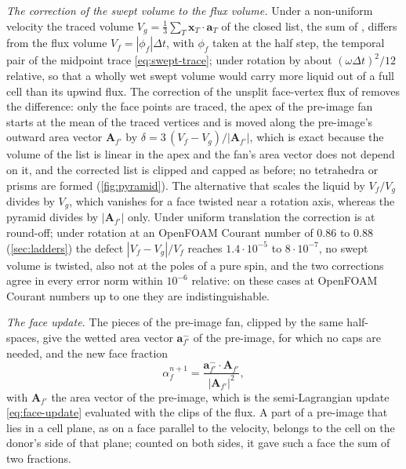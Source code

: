 \documentclass[preprint,12pt]{elsarticle}
\newcommand{\x}{\mathbf{x}}
\begin{document}
\emph{The correction of the swept volume to the flux volume.} Under a non-uniform velocity the traced volume $V_g = \tfrac13\sum_T \x_T\cdot\mathbf{a}_T$ of the closed list, the sum of \citet{TolleEtAl2022TriSurface}, differs from the flux volume $V_f = |\phi_f|\Delta t$, with $\phi_f$ taken at the half step, the temporal pair of the midpoint trace \cref{eq:swept-trace}; under rotation by about $(\omega\Delta t)^2/12$ relative, so that a wholly wet swept volume would carry more liquid out of a full cell than its upwind flux. The correction of the unsplit face-vertex flux of \citet{MaricMarschallBothe2018} removes the difference: only the face points are traced, the apex of the pre-image fan starts at the mean of the traced vertices and is moved along the pre-image's outward area vector $\mathbf{A}_{f'}$ by $\delta = 3\,(V_f - V_g)/|\mathbf{A}_{f'}|$, which is exact because the volume of the list is linear in the apex and the fan's area vector does not depend on it, and the corrected list is clipped and capped as before; no tetrahedra or prisms are formed (\cref{fig:pyramid}). The alternative that scales the liquid by $V_f/V_g$ divides by $V_g$, which vanishes for a face twisted near a rotation axis, whereas the pyramid divides by $|\mathbf{A}_{f'}|$ only. Under uniform translation the correction is at round-off; under rotation at an OpenFOAM Courant number of $0.86$ to $0.88$ (\cref{sec:ladders}) the defect $|V_f - V_g|/V_f$ reaches $1.4\cdot10^{-5}$ to $8\cdot10^{-7}$, no swept volume is twisted, also not at the poles of a pure spin, and the two corrections agree in every error norm within $10^{-6}$ relative: on these cases at OpenFOAM Courant numbers up to one they are indistinguishable.

\emph{The face update.} The pieces of the pre-image fan, clipped by the same half-spaces, give the wetted area vector $\mathbf{a}_{f'}^-$ of the pre-image, for which no caps are needed, and the new face fraction
\begin{equation}
\alpha_f^{n+1} = \frac{\mathbf{a}_{f'}^-\cdot\mathbf{A}_{f'}}{|\mathbf{A}_{f'}|^2} ,
\label{eq:swept-face}
\end{equation}
with $\mathbf{A}_{f'}$ the area vector of the pre-image, which is the semi-Lagrangian update \cref{eq:face-update} evaluated with the clips of the flux. A part of a pre-image that lies in a cell plane, as on a face parallel to the velocity, belongs to the cell on the donor's side of that plane; counted on both sides, it gave such a face the sum of two fractions.
\end{document}
